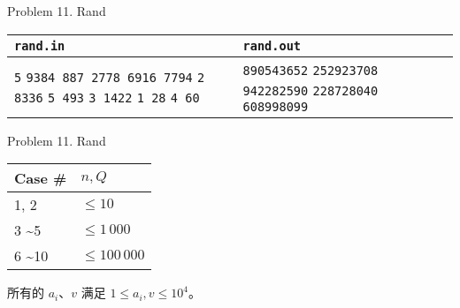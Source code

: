 \documentclass[UTF8]{beamer}
\begin{document}
\begin{frame}{Problem 11. Rand}

\begin{tabularx}{\textwidth}{|X|X|}
\hline
\texttt{\textbf{rand.in}} & \texttt{\textbf{rand.out}} \\ \hline
\texttt{5}\newline
\texttt{9384 887 2778 6916 7794}\newline
\texttt{2 8336}\newline
\texttt{5 493}\newline
\texttt{3 1422}\newline
\texttt{1 28}\newline
\texttt{4 60}
&
\texttt{890543652}\newline
\texttt{252923708}\newline
\texttt{942282590}\newline
\texttt{228728040}\newline
\texttt{608998099}
\\ \hline
\end{tabularx}
\newline

\end{frame}

\begin{frame}{Problem 11. Rand}

\begin{tabularx}{\textwidth}{X|X} \hline
Case \# & $n, Q$ \\ \hline \hline
1, 2                 & $\leq 10$       \\ \hline
3 \textasciitilde 5  & $\leq 1\,000$   \\ \hline
6 \textasciitilde 10 & $\leq 100\,000$ \\ \hline
\end{tabularx}

所有的 $a_i$、$v$ 满足 $1 \leq a_i, v \leq 10^4$。

\end{frame}
\end{document}
